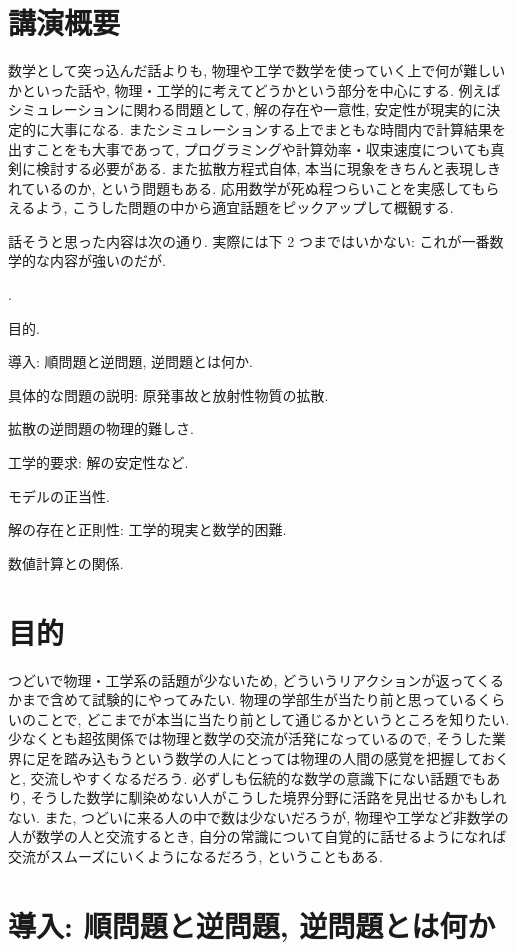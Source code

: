 \documentclass[openany, a4paper, oneside]{book}
\newcounter{enum2}
\renewenvironment{enumerate}{%
\begin{list}%
{%
\arabic{enum2}.\ \,%
}%
{%
\usecounter{enum2}
\setlength{\itemindent}{0pt}%
\setlength{\leftmargin}{6pt}%
\setlength{\rightmargin}{0pt}%
\setlength{\labelsep}{0pt}%
\setlength{\labelwidth}{6pt}%
\setlength{\itemsep}{0pt}%
\setlength{\parsep}{0pt}%
\setlength{\listparindent}{0pt}%
}
}{%
\end{list}%
}
\theoremstyle{break}
\theoremstyle{breakdefn}
\begin{document}
\section{講演概要}
\label{sec-7-9-3}

数学として突っ込んだ話よりも, 物理や工学で数学を使っていく上で何が難しいかといった話や,
物理・工学的に考えてどうかという部分を中心にする.
例えばシミュレーションに関わる問題として, 解の存在や一意性, 安定性が現実的に決定的に大事になる.
またシミュレーションする上でまともな時間内で計算結果を出すことをも大事であって,
プログラミングや計算効率・収束速度についても真剣に検討する必要がある.
また拡散方程式自体, 本当に現象をきちんと表現しきれているのか, という問題もある.
応用数学が死ぬ程つらいことを実感してもらえるよう,
こうした問題の中から適宜話題をピックアップして概観する.

話そうと思った内容は次の通り.
実際には下 2 つまではいかない: これが一番数学的な内容が強いのだが.
\begin{enumerate}
\item 目的.
\item 導入: 順問題と逆問題, 逆問題とは何か.
\item 具体的な問題の説明: 原発事故と放射性物質の拡散.
\item 拡散の逆問題の物理的難しさ.
\item 工学的要求: 解の安定性など.
\item モデルの正当性.
\item 解の存在と正則性: 工学的現実と数学的困難.
\item 数値計算との関係.
\end{enumerate}
\section{目的}
\label{sec-7-9-4}

つどいで物理・工学系の話題が少ないため, どういうリアクションが返ってくるかまで含めて試験的にやってみたい.
物理の学部生が当たり前と思っているくらいのことで, どこまでが本当に当たり前として通じるかというところを知りたい.
少なくとも超弦関係では物理と数学の交流が活発になっているので,
そうした業界に足を踏み込もうという数学の人にとっては物理の人間の感覚を把握しておくと, 交流しやすくなるだろう.
必ずしも伝統的な数学の意識下にない話題でもあり, そうした数学に馴染めない人がこうした境界分野に活路を見出せるかもしれない.
また, つどいに来る人の中で数は少ないだろうが, 物理や工学など非数学の人が数学の人と交流するとき,
自分の常識について自覚的に話せるようになれば交流がスムーズにいくようになるだろう, ということもある.
\section{導入: 順問題と逆問題, 逆問題とは何か}
\label{sec-7-9-5}
\end{document}
